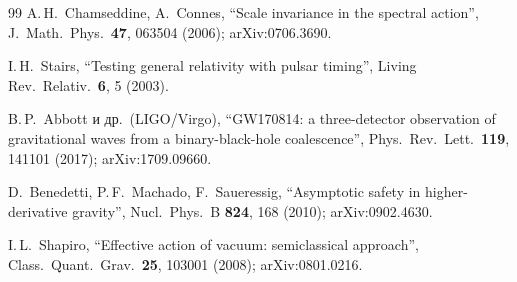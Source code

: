 \documentclass[twocolumn,10pt]{article}
\begin{document}
\begin{thebibliography}{99}
A.\,H.~Chamseddine, A.~Connes,
``Scale invariance in the spectral action'',
J.\ Math.\ Phys.\ \textbf{47}, 063504 (2006);
arXiv:0706.3690.

I.\,H.~Stairs,
``Testing general relativity with pulsar timing'',
Living Rev.\ Relativ.\ \textbf{6}, 5 (2003).

B.\,P.~Abbott и др.\ (LIGO/Virgo),
``GW170814: a three-detector observation of gravitational waves
from a binary-black-hole coalescence'',
Phys.\ Rev.\ Lett.\ \textbf{119}, 141101 (2017);
arXiv:1709.09660.

D.~Benedetti, P.\,F.~Machado, F.~Saueressig,
``Asymptotic safety in higher-derivative gravity'',
Nucl.\ Phys.\ B \textbf{824}, 168 (2010);
arXiv:0902.4630.

I.\,L.~Shapiro,
``Effective action of vacuum: semiclassical approach'',
Class.\ Quant.\ Grav.\ \textbf{25}, 103001 (2008);
arXiv:0801.0216.

\end{thebibliography}
\end{document}
